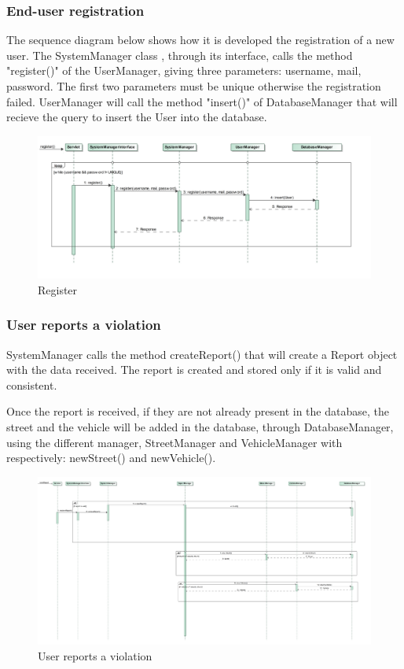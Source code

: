 \subsubsection{End-user registration}
The sequence diagram below shows how it is developed the registration of a new user. The SystemManager class , through its interface, calls  the method "register()" of the UserManager, giving three parameters: username, mail, password. The first two parameters must be unique otherwise the registration failed.
UserManager will call the method "insert()" of DatabaseManager that will recieve the query to insert the User into the database.
\begin{figure}[H]
	\centering
	\includegraphics[width=0.97\linewidth, height=0.32\textheight]{Images/RunTimeDiagram/Sequence1}
	\caption{Register}
	\label{fig:Register}
\end{figure}
\subsubsection{User reports a violation}
 SystemManager calls the method createReport() that will create a Report object with the data received. The report is created and stored only if it is valid and consistent. 
 
Once the report is received, if they are not already present in the database, the street and the vehicle will be added in the database, through DatabaseManager, using the different manager, StreetManager and VehicleManager with respectively: newStreet() and newVehicle().
\begin{figure}[H] 
	\centering
	\includegraphics[width=0.95\linewidth, height=0.7\textheight]{Images/RunTimeDiagram/Sequence2}
	\caption{User reports a violation}
	\label{fig:User reports a violation}
\end{figure}

